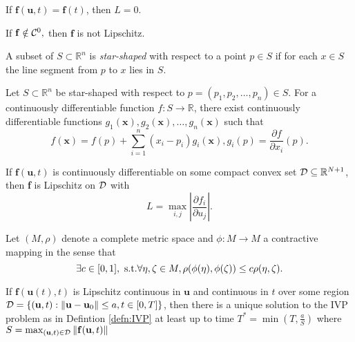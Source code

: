 \begin{exm}
  If $\mathbf{f}(\mathbf{u},t)=\mathbf{f}(t)$, then $L=0$.
\end{exm}

\begin{exm}
  If $\mathbf{f}\notin {\cal C}^0,$ then $\mathbf{f}$ is not Lipschitz.
\end{exm}

\begin{defn}
  A subset of $S\subset\mathbb{R}^n$ is \emph{star-shaped} with
  respect to a point $p\in S$ if for each $x\in S$ the line segment
  from $p$ to $x$ lies in $S$.
\end{defn}

\begin{thm}\label{thm:star-shaped}
  Let $S\subset \mathbb{R}^n$ be star-shaped with respect to
  $p=(p_1,p_2,\ldots,p_n)\in S.$
  For a continuously differentiable function $f: S\rightarrow
  \mathbb{R}$,
  there exist continuously differentiable functions $g_1(\mathbf{x}),
  g_2(\mathbf{x}),\ldots,g_n(\mathbf{x})$ such that
  \begin{equation}
    f(\mathbf{x})=f(p)+\sum_{i=1}^{n}(x_i-p_i)g_i(\mathbf{x}),
    g_i(p)=\frac{\partial f}{\partial x_i}(p).
  \end{equation}
\end{thm}

\begin{prop}
  If $\mathbf{f}(\mathbf{u},t)$ is continuously differentiable on some
  compact convex set ${\cal D}\subseteq \mathbb{R}^{N+1}$,
  then \textbf{f} is Lipschitz on ${\cal D}$ with
  \begin{displaymath}
    L=\max_{i,j}\left\vert \frac{\partial f_i}{\partial u_j}\right\vert.
  \end{displaymath}
\end{prop}

\begin{lem}
  Let $(M,\rho)$ denote a complete metric space and $\phi:M\rightarrow
  M $ a contractive mapping in the sense that
  \begin{equation}
    \exists c\in [0,1], \textmd{ s.t.}
\forall \eta,\zeta \in M, \rho(\phi(\eta),\phi(\zeta))\leq c\rho(\eta,\zeta).
  \end{equation}
\end{lem}

\begin{thm}
If $\mathbf{f}(\mathbf{u}(t),t)$ is Lipschitz continuous in
$\mathbf{u}$ and continuous in $t$ over some region ${\cal D}=\{(\mathbf{u},t):\Vert\mathbf{u}-\mathbf{u}_0\Vert\leq a,t\in [0,T]\}$,
then there is a unique solution to the IVP problem as in Defintion
\ref{defn:IVP} at least up to time $T^*=\min (T,\frac{a}{S})$
where $S=\max_{(\mathbf{u},t)\in{\cal D}}\Vert \mathbf{f}(\mathbf{u},t)\Vert$
\end{thm}

